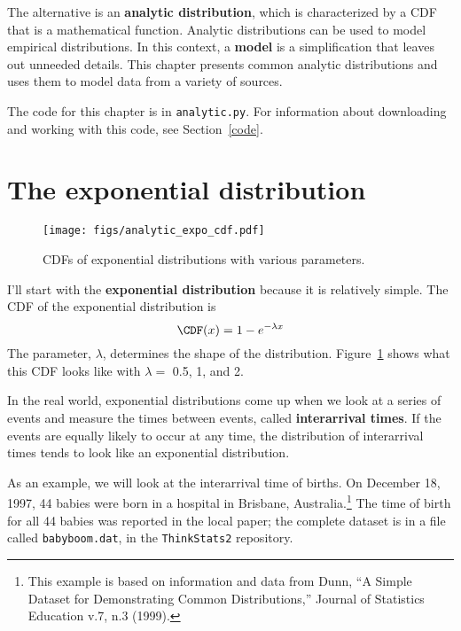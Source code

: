 \documentclass[12pt]{book}
\begin{document}
The alternative is an {\bf analytic distribution}, which is
characterized by a CDF that is a mathematical function.
Analytic distributions can be used to model empirical distributions.
In this context, a {\bf model} is a simplification that leaves out
unneeded details.  This chapter presents common analytic distributions
and uses them to model data from a variety of sources.

The code for this chapter is in {\tt analytic.py}.  For information
about downloading and working with this code, see Section~\ref{code}.



\section{The exponential distribution}
\label{exponential}

\begin{figure}
\centerline{\texttt{[image: figs/analytic\_expo\_cdf.pdf]}}
\caption{CDFs of exponential distributions with various parameters.}
\label{analytic_expo_cdf}
\end{figure}

I'll start with the {\bf exponential distribution} because it is
relatively simple.  The CDF of the exponential distribution is
%
\[ \CDF(x) = 1 - e^{-\lambda x} \]
%
The parameter, $\lambda$, determines the shape of the distribution.
Figure~\ref{analytic_expo_cdf} shows what this CDF looks like with
$\lambda = $ 0.5, 1, and 2.

In the real world, exponential distributions
come up when we look at a series of events and measure the
times between events, called {\bf interarrival times}.
If the events are equally likely to occur at any time, the distribution
of interarrival times tends to look like an exponential distribution.

As an example, we will look at the interarrival time of births.
On December 18, 1997, 44 babies were born in a hospital in Brisbane,
Australia.\footnote{This example is based on information and data from
  Dunn, ``A Simple Dataset for Demonstrating Common Distributions,''
  Journal of Statistics Education v.7, n.3 (1999).}  The time of
birth for all 44 babies was reported in the local paper; the
complete dataset is in a file called {\tt babyboom.dat}, in the
{\tt ThinkStats2} repository.
 
\end{document}
